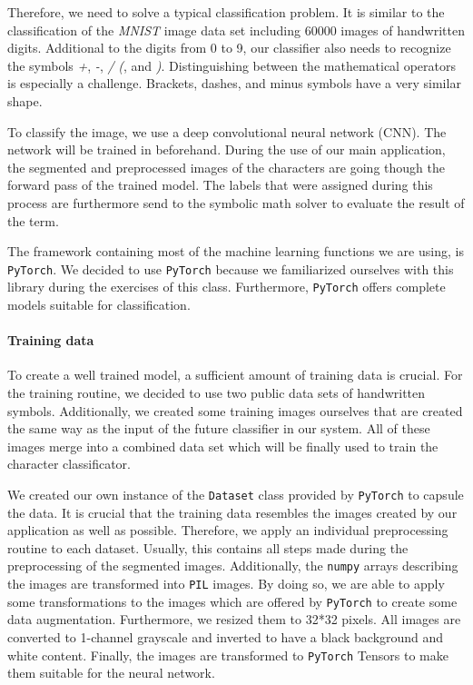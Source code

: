\documentclass[11pt]{article}
\begin{document}
	Therefore, we need to solve a typical classification problem. It is similar to the classification of the \textit{MNIST} image data set including 60000 images of handwritten digits. Additional to the digits from 0 to 9, our classifier also needs to recognize the symbols \textit{+}, \textit{-}, \textit{/} \textit{(}, and \textit{)}. Distinguishing between the mathematical operators is especially a challenge. Brackets, dashes, and minus symbols have a very similar shape.
	
	To classify the image, we use a deep convolutional neural network (CNN). The network will be trained in beforehand. During the use of our main application, the segmented and preprocessed images of the characters are going though the forward pass of the trained model. The labels that were assigned during this process are furthermore send to the symbolic math solver to evaluate the result of the term. 
	
	The framework containing most of the machine learning functions we are using, is \texttt{PyTorch}. We decided to use \texttt{PyTorch} because we familiarized ourselves with this library during the exercises of this class. Furthermore, \texttt{PyTorch} offers complete models suitable for classification.
		
	
	\paragraph{Training data}
		To create a well trained model, a sufficient amount of training data is crucial. For the training routine, we decided to use two public data sets of handwritten symbols. Additionally, we created some training images ourselves that are created the same way as the input of the future classifier in our system. All of these images merge into a combined data set which will be finally used to train the character classificator.
		
		We created our own instance of the \texttt{Dataset} class provided by \texttt{PyTorch} to capsule the data. It is crucial that the training data resembles the images created by our application as well as possible. Therefore, we apply an individual preprocessing routine to each dataset. Usually, this contains all steps made during the preprocessing of the segmented images. Additionally, the \texttt{numpy} arrays describing the images are transformed into \texttt{PIL} images. By doing so, we are able to apply some transformations to the images which are offered by \texttt{PyTorch} to create some data augmentation. Furthermore, we resized them to 32*32 pixels. All images are converted to 1-channel grayscale and inverted to have a black background and white content. Finally, the images are transformed to \texttt{PyTorch} Tensors to make them suitable for the neural network. 
		
\end{document}
